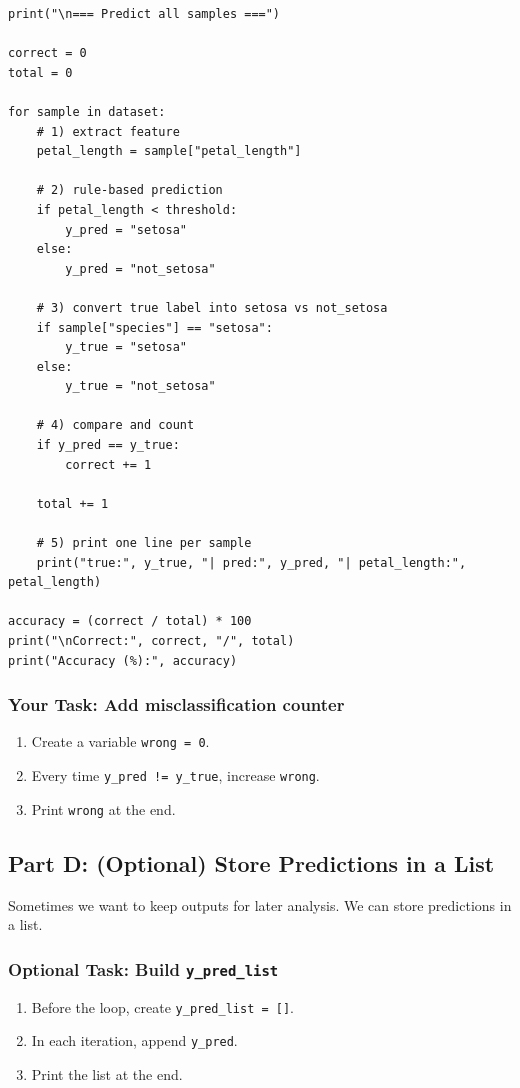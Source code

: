 \begin{verbatim}
print("\n=== Predict all samples ===")

correct = 0
total = 0

for sample in dataset:
    # 1) extract feature
    petal_length = sample["petal_length"]

    # 2) rule-based prediction
    if petal_length < threshold:
        y_pred = "setosa"
    else:
        y_pred = "not_setosa"

    # 3) convert true label into setosa vs not_setosa
    if sample["species"] == "setosa":
        y_true = "setosa"
    else:
        y_true = "not_setosa"

    # 4) compare and count
    if y_pred == y_true:
        correct += 1

    total += 1

    # 5) print one line per sample
    print("true:", y_true, "| pred:", y_pred, "| petal_length:", petal_length)

accuracy = (correct / total) * 100
print("\nCorrect:", correct, "/", total)
print("Accuracy (%):", accuracy)
\end{verbatim}

\subsubsection{Your Task: Add misclassification counter}
\begin{enumerate}
    \item Create a variable \texttt{wrong = 0}.
    \item Every time \texttt{y\_pred != y\_true}, increase \texttt{wrong}.
    \item Print \texttt{wrong} at the end.
\end{enumerate}

\newpage
\subsection{Part D: (Optional) Store Predictions in a List}

Sometimes we want to keep outputs for later analysis. We can store predictions in a list.

\subsubsection{Optional Task: Build \texttt{y\_pred\_list}}
\begin{enumerate}
    \item Before the loop, create \texttt{y\_pred\_list = []}.
    \item In each iteration, append \texttt{y\_pred}.
    \item Print the list at the end.
\end{enumerate}

